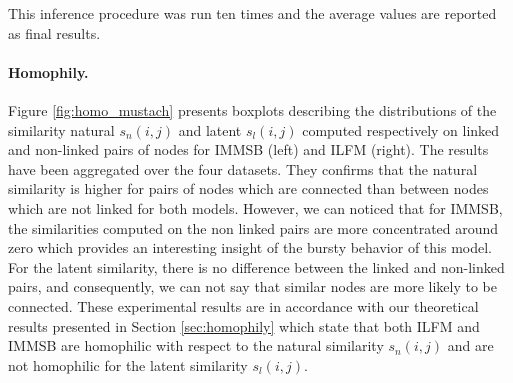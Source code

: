 This inference procedure was run ten times and the average values are reported as final results.


\paragraph{Homophily.} Figure \ref{fig:homo_mustach} presents boxplots describing the distributions of the similarity natural $s_n(i,j)$ and latent $s_l(i,j)$ computed respectively on linked and non-linked pairs of nodes for IMMSB (left) and ILFM (right). The results have been aggregated over the four datasets.  They confirms that the natural similarity is  higher for  pairs of nodes which are connected than between nodes which are not linked for both models. However, we can noticed that for IMMSB, the similarities computed on the non linked pairs are more concentrated around zero which provides an interesting insight of the bursty behavior of this model. For the latent similarity,  there is no difference between the linked and non-linked pairs, and consequently, we can not say that similar nodes are more likely to be connected. These experimental results are in accordance with our theoretical results presented in Section \ref{sec:homophily} which state that both ILFM and IMMSB are homophilic with respect to the natural similarity $s_n(i,j)$ and are not homophilic for the latent similarity $s_l(i,j)$.

